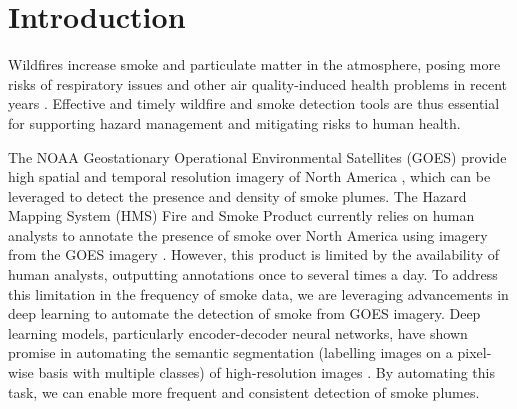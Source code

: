 \documentclass{article}
\begin{document}
\section{Introduction}
Wildfires increase smoke and particulate matter in the atmosphere, posing more risks of respiratory issues and other air quality-induced health problems in recent years \citep{wildfire-risk}. Effective and timely wildfire and smoke detection tools are thus essential for supporting hazard management and mitigating risks to human health. 

The NOAA Geostationary Operational Environmental Satellites (GOES) provide high spatial and temporal resolution imagery of North America \citep{GOESbook}, which can be leveraged to detect the presence and density of smoke plumes. The Hazard Mapping System (HMS) Fire and Smoke Product currently relies on human analysts to annotate the presence of smoke over North America using imagery from the GOES imagery \citep{hms}. However, this product is limited by the availability of human analysts, outputting annotations once to several times a day. To address this limitation in the frequency of smoke data, we are leveraging advancements in deep learning to automate the detection of smoke from GOES imagery. Deep learning models, particularly encoder-decoder neural networks, have shown promise in automating the semantic segmentation (labelling images on a pixel-wise basis with multiple classes) of high-resolution images \citep{cv-segmentation-review}. By automating this task, we can enable more frequent and consistent detection of smoke plumes.
\end{document}
